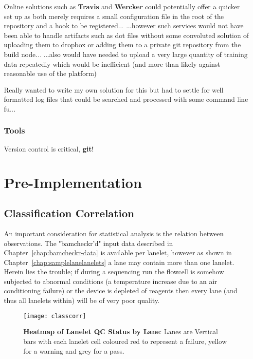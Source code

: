 Online solutions such as \textbf{Travis} and \textbf{Wercker} could potentially
offer a quicker set up as both merely requires a small configuration file in the
root of the repository and a hook to be registered...
...however such services would
not have been able to handle artifacts such as dot files without some convoluted
solution of uploading them to dropbox or adding them to a private git repository
from the build node...  ...also would have needed to upload a very large
quantity of training data repeatedly which would be inefficient (and more than
likely against reasonable use of the platform)

Really wanted to write my own solution for this but had to settle for well
formatted log files that could be searched and processed with some command line
fu...

\subsection{Tools}
Version control is critical, \textbf{git}!


\chapter{Pre-Implementation}
\section{Classification Correlation}

An important consideration for statistical analysis is the relation between
observations. The "bamcheckr'd" input data described in
Chapter~\ref{chap:bamcheckr-data} is available per lanelet, however as shown in
Chapter~\ref{chap:samplelanelanelets} a lane may contain more than one lanelet.
Herein lies the trouble; if during a sequencing run the flowcell is somehow
subjected to abnormal conditions (a temperature increase due to an air
conditioning failure) or the device is depleted of reagents then every lane (and
thus all lanelets within) will be of very poor quality.

\begin{figure}[htbp!]
    \centering
    \texttt{[image: classcorr]}
    \caption[ClassCorr]{\textbf{Heatmap of Lanelet QC Status by Lane}: Lanes are
    Vertical bars with each lanelet cell coloured red to represent a failure,
yellow for a warning and grey for a pass.}
    \label{fig:classcorr}
\end{figure}

